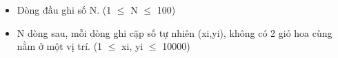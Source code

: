 \begin{itemize}
	\item     Dòng đầu ghi số N. (1  $\le$  N  $\le$  100)   
\end{itemize}
\begin{itemize}
	\item     N dòng sau, mỗi dòng ghi cặp số tự nhiên (xi,yi), không có 2 giỏ hoa cùng nằm ở một vị trí. (1  $\le$  xi, yi  $\le$  10000)   
\end{itemize}